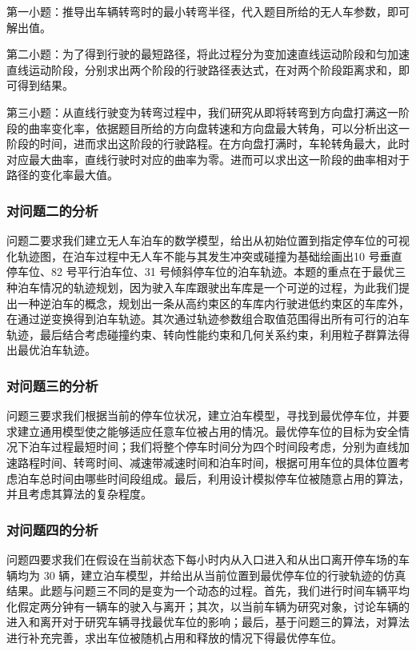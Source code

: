 \documentclass{MathorCupmodeling}
\begin{document}
	第一小题：推导出车辆转弯时的最小转弯半径，代入题目所给的无人车参数，即可解出值。

	第二小题：为了得到行驶的最短路径，将此过程分为变加速直线运动阶段和匀加速直线运动阶段，分别求出两个阶段的行驶路径表达式，在对两个阶段距离求和，即可得到结果。

	第三小题：从直线行驶变为转弯过程中，我们研究从即将转弯到方向盘打满这一阶段的曲率变化率，依据题目所给的方向盘转速和方向盘最大转角，可以分析出这一阶段的时间，进而求出这阶段的行驶路程。在方向盘打满时，车轮转角最大，此时对应最大曲率，直线行驶时对应的曲率为零。进而可以求出这一阶段的曲率相对于路径的变化率最大值。
	\subsubsection{对问题二的分析}

	问题二要求我们建立无人车泊车的数学模型，给出从初始位置到指定停车位的可视化轨迹图，在泊车过程中无人车不能与其发生冲突或碰撞为基础绘画出10 号垂直停车位、82 号平行泊车位、31 号倾斜停车位的泊车轨迹。本题的重点在于最优三种泊车情况的轨迹规划，因为驶入车库跟驶出车库是一个可逆的过程，为此我们提出一种逆泊车的概念，规划出一条从高约束区的车库内行驶进低约束区的车库外，在通过逆变换得到泊车轨迹。其次通过轨迹参数组合取值范围得出所有可行的泊车轨迹，最后结合考虑碰撞约束、转向性能约束和几何关系约束，利用粒子群算法得出最优泊车轨迹。
	\subsubsection{对问题三的分析}

	问题三要求我们根据当前的停车位状况，建立泊车模型，寻找到最优停车位，并要求建立通用模型使之能够适应任意车位被占用的情况。最优停车位的目标为安全情况下泊车过程最短时间；我们将整个停车时间分为四个时间段考虑，分别为直线加速路程时间、转弯时间、减速带减速时间和泊车时间，根据可用车位的具体位置考虑泊车总时间由哪些时间段组成。最后，利用设计模拟停车位被随意占用的算法，并且考虑其算法的复杂程度。
	\subsubsection{对问题四的分析}
	
	问题四要求我们在假设在当前状态下每小时内从入口进入和从出口离开停车场的车辆均为 30 辆，建立泊车模型，并给出从当前位置到最优停车位的行驶轨迹的仿真结果。此题与问题三不同的是变为一个动态的过程。首先，我们进行时间车辆平均化假定两分钟有一辆车的驶入与离开；其次，以当前车辆为研究对象，讨论车辆的进入和离开对于研究车辆寻找最优车位的影响；最后，基于问题三的算法，对算法进行补充完善，求出车位被随机占用和释放的情况下得最优停车位。
\end{document}
